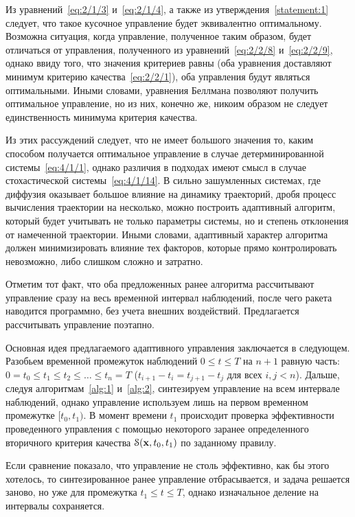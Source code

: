 Из уравнений~\ref{eq:2/1/3} и~\ref{eq:2/1/4}, а также из утверждения~\vref{statement:1} следует, что такое кусочное управление будет эквивалентно оптимальному. Возможна ситуация, когда управление, полученное таким образом, будет отличаться от управления, полученного из уравнений~\ref{eq:2/2/8} и~\vref{eq:2/2/9}, однако ввиду того, что значения критериев равны (оба уравнения доставляют минимум критерию качества~\vref{eq:2/2/1}), оба управления будут являться оптимальными. Иными словами, уравнения Беллмана позволяют получить оптимальное управление, но из них, конечно же, никоим образом не следует единственность минимума критерия качества.

Из этих рассуждений следует, что не имеет большого значения то, каким способом получается оптимальное управление в случае детерминированной системы~\vref{eq:4/1/1}, однако различия в подходах имеют смысл в случае стохастической системы~\vref{eq:4/1/14}. В сильно зашумленных системах, где диффузия оказывает большое влияние на динамику траекторий, дробя процесс вычисления траектории на несколько, можно построить адаптивный алгоритм, который будет учитывать не только параметры системы, но и степень отклонения от намеченной траектории. Иными словами, адаптивный характер алгоритма должен минимизировать влияние тех факторов, которые прямо контролировать невозможно, либо слишком сложно и затратно.

Отметим тот факт, что оба предложенных ранее алгоритма рассчитывают управление сразу на весь временной интервал наблюдений, после чего ракета наводится программно, без учета внешних воздействий. Предлагается рассчитывать управление поэтапно.

\br

Основная идея предлагаемого адаптивного управления заключается в следующем. Разобьем временной промежуток наблюдений $0 \leqslant t \leqslant T$ на $n+1$ равную часть: $0 = t_0 \leqslant t_1 \leqslant t_2 \leqslant \ldots \leqslant t_{n} = T$ ($t_{i+1}-t_i = t_{j+1}-t_j$ для всех $i, j < n$). Дальше, следуя алгоритмам~\ref{alg:1} и~\ref{alg:2}, синтезируем управление на всем интервале наблюдений, однако управление используем лишь на первом временном промежутке $[t_0, t_1)$. В момент времени $t_1$ происходит проверка эффективности проведенного управления с помощью некоторого заранее определенного вторичного критерия качества $\mathcal{S}(\mathbf{x}, t_0, t_1)$ по заданному правилу.

Если сравнение показало, что управление не столь эффективно, как бы этого хотелось, то синтезированное ранее управление отбрасывается, и задача решается заново, но уже для промежутка $t_1 \leqslant t \leqslant T$, однако изначальное деление на интервалы сохраняется.


